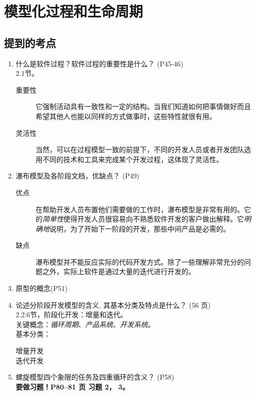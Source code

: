 \documentclass[14pt, letterpaper, UTF8, fontset=windowsnew, heading=true]{article}
\begin{document}
\section{模型化过程和生命周期}

\subsection{提到的考点}

\begin{enumerate}
	\item 什么是软件过程？软件过程的重要性是什么？ (P45-46) \\
	2.1节。
	\begin{description}
		\item[重要性] 它强制活动具有一致性和一定的结构。当我们知道如何把事情做好而且希望其他人也能以同样的方式做事时，这些特性就很有用。
		\item[灵活性] 当然，可以在过程模型一致的前提下，不同的开发人员或者开发团队选用不同的技术和工具来完成某个开发过程，这体现了灵活性。
	\end{description}

	\item 瀑布模型及各阶段文档，优缺点？ (P49)
	\begin{description}
		\item[优点] 在帮助开发人员布置他们需要做的工作时，瀑布模型是非常有用的。它的\emph{简单性}使得开发人员很容易向不熟悉软件开发的客户做出解释。它\emph{明确地}说明，为了开始下一阶段的开发，那些中间产品是必需的。
		\item[缺点] 瀑布模型并不能反应实际的代码开发方式。除了一些理解非常充分的问题之外，实际上软件是通过大量的迭代进行开发的。
	\end{description}
	
	\item 原型的概念(P51)
	
	\item 论述分阶段开发模型的含义, 其基本分类及特点是什么？ (56 页) \\
	2.2.6节，阶段化开发：增量和迭代。 \\
	关键概念：\emph{循环周期}、\emph{产品系统}、\emph{开发系统}。\\
	基本分类：
	\begin{description}
		\item[增量开发] 
		\item[迭代开发] 
	\end{description}
	
	\item 螺旋模型四个象限的任务及四重循环的含义？ (P58)
	\\ \textbf{要做习题！P80--81 页 习题 2， 3。}
	

\end{enumerate}
\end{document}
